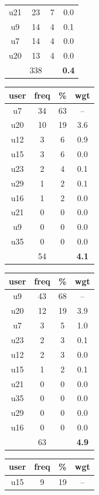 \begin{table}
\begin{tabular}{ |c|c|c|c| }
	u21 & 23 & 7 & 0.0 \\
	u9 & 14 & 4 & 0.1 \\
	u7 & 14 & 4 & 0.0 \\
	u20 & 13 & 4 & 0.0 \\
	 & 338 & & \textbf{0.4} \\
	\hline
\end{tabular}
\begin{tabular}{ |c|c|c|c| }
	\hline
	\textbf{user} & \textbf{freq} & \textbf{\%} & \textbf{wgt} \\
	\hline
	u7 & 34 & 63 & -- \\
	u20 & 10 & 19 & 3.6 \\
	u12 & 3 & 6 & 0.9 \\
	u15 & 3 & 6 & 0.0 \\
	u23 & 2 & 4 & 0.1 \\
	u29 & 1 & 2 & 0.1 \\
	u16 & 1 & 2 & 0.0 \\
	u21 & 0 & 0 & 0.0 \\
	u9 & 0 & 0 & 0.0 \\
	u35 & 0 & 0 & 0.0 \\
	 & 54 & & \textbf{4.1} \\
	\hline
\end{tabular}
\begin{tabular}{ |c|c|c|c| }
	\hline
	\textbf{user} & \textbf{freq} & \textbf{\%} & \textbf{wgt} \\
	\hline
	u9 & 43 & 68 & -- \\
	u20 & 12 & 19 & 3.9 \\
	u7 & 3 & 5 & 1.0 \\
	u23 & 2 & 3 & 0.1 \\
	u12 & 2 & 3 & 0.0 \\
	u15 & 1 & 2 & 0.1 \\
	u21 & 0 & 0 & 0.0 \\
	u35 & 0 & 0 & 0.0 \\
	u29 & 0 & 0 & 0.0 \\
	u16 & 0 & 0 & 0.0 \\
	 & 63 & & \textbf{4.9} \\
	\hline
\end{tabular}
\begin{tabular}{ |c|c|c|c| }
	\hline
	\textbf{user} & \textbf{freq} & \textbf{\%} & \textbf{wgt} \\
	\hline
	u15 & 9 & 19 & -- \\

\end{tabular}
\end{table}
